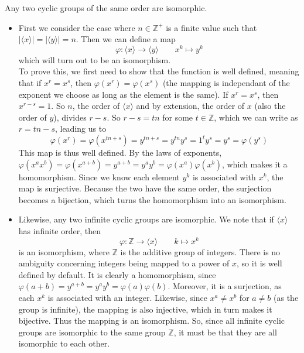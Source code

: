 \documentclass[12pt]{article}
\newcommand{\Z}{\mathbb{Z}}
\newcommand{\ang}[1]{\langle #1 \rangle}
\begin{document}
    Any two cyclic groups of the same order are isomorphic.
    \begin{itemize}[label=$\diamond$]
        \item 
            First we consider the case where
            $n \in \Z^+$ is a finite value
            such that $|\ang{x}| = |\ang{y}| = n$.
            Then we can define a map
            \[ \varphi: \ang{x} \to \ang{y} \qquad x^k \mapsto y^k \]
            which will turn out to be an isomorphism. \\
            To prove this,
            we first need to show that the function is well defined,
            meaning that if $x^r = x^s$,
            then $\varphi(x^r) = \varphi(x^s)$
            (the mapping is independant of the exponent we choose
            as long as the element is the same).
            If $x^r = x^s$, then $x^{r-s} = 1$.
            So $n$, the order of $\ang{x}$ and by extension,
            the order of $x$ (also the order of $y$),
            divides $r - s$.
            So $r-s = tn$ for some $t \in \Z$,
            which we can write as $r = tn - s$,
            leading us to
            \[
                \varphi(x^r) = \varphi(x^{tn + s})
                = y^{tn + s}
                = y^{tn}y^{s}
                = 1^ty^s
                = y^s
                = \varphi(y^s)
            \]
            This map is thus well defined.
            By the laws of exponents,
            $\varphi(x^ax^b) = \varphi(x^{a+b})
            = y^{a+b} = y^ay^b = \varphi(x^a)\varphi(x^b)$,
            which makes it a homomorphism. 
            Since we know each element $y^k$
            is associated with $x^k$,
            the map is surjective.
            Because the two have the same order,
            the surjection becomes a bijection,
            which turns the homomorphism into an isomorphism.
        \item 
            Likewise,
            any two infinite cyclic groups are isomorphic.
            We note that if $\ang{x}$ has infinite order,
            then
            \[ \varphi: \Z \to \ang{x} \qquad k \mapsto x^k \]  
            is an isomorphism,
            where $\Z$ is the additive group of integers.
            There is no ambiguity concerning integers being mapped
            to a power of $x$, so it is well defined by default.
            It is clearly a homomorphism,
            since $\varphi(a+b) = y^{a+b} = y^ay^b = \varphi(a)\varphi(b)$.
            Moreover, it is a surjection,
            as each $x^k$ is associated with an integer.
            Likewise,
            since $x^a \neq x^b$ for $a \neq b$
            (as the group is infinite),
            the mapping is also injective,
            which in turn makes it bijective.
            Thus the mapping is an isomorphism. 
            So, since all infinite cyclic groups are isomorphic
            to the same group $\Z$,
            it must be that they are all isomorphic to each other.
    \end{itemize}
\end{document}
